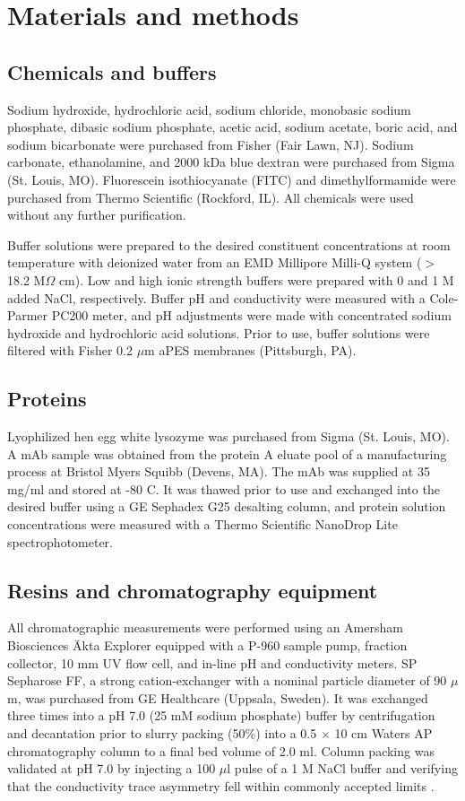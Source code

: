 \documentclass[preprint,review,12pt]{elsarticle}
\begin{document}
\section{Materials and methods} \label{sec:mm}

    \subsection{Chemicals and buffers} \label{ssec:buffers}
        Sodium hydroxide, hydrochloric acid, sodium chloride, monobasic sodium phosphate, dibasic sodium phosphate, acetic acid, sodium acetate, boric acid, and sodium bicarbonate were purchased from Fisher (Fair Lawn, NJ). Sodium carbonate, ethanolamine, and 2000 kDa blue dextran were purchased from Sigma (St. Louis, MO). Fluorescein isothiocyanate (FITC) and dimethylformamide were purchased from Thermo Scientific (Rockford, IL). All chemicals were used without any further purification.

        Buffer solutions were prepared to the desired constituent concentrations at room temperature with deionized water from an EMD Millipore Milli-Q system ($>$ 18.2 M$\Omega$ cm). Low and high ionic strength buffers were prepared with 0 and 1 M added NaCl, respectively. Buffer pH and conductivity were measured with a Cole-Parmer PC200 meter, and pH adjustments were made with concentrated sodium hydroxide and hydrochloric acid solutions. Prior to use, buffer solutions were filtered with Fisher 0.2 $\mu$m aPES membranes (Pittsburgh, PA).

    \subsection{Proteins} \label{ssec:proteins}
        Lyophilized hen egg white lysozyme was purchased from Sigma (St. Louis, MO). A mAb sample was obtained from the protein A eluate pool of a manufacturing process at Bristol Myers Squibb (Devens, MA). The mAb was supplied at 35 mg/ml and stored at -80 \degree C. It was thawed prior to use and exchanged into the desired buffer using a GE Sephadex G25 desalting column, and protein solution concentrations were measured with a Thermo Scientific NanoDrop Lite spectrophotometer.

    \subsection{Resins and chromatography equipment} \label{ssec:equip}
        All chromatographic measurements were performed using an Amersham Biosciences \"{A}kta Explorer equipped with a P-960 sample pump, fraction collector, 10 mm UV flow cell, and in-line pH and conductivity meters. SP Sepharose FF, a strong cation-exchanger with a nominal particle diameter of 90 $\mu$m, was purchased from GE Healthcare (Uppsala, Sweden). It was exchanged three times into a pH 7.0 (25 mM sodium phosphate) buffer by centrifugation and decantation prior to slurry packing (50\%) into a 0.5 $\times$ 10 cm Waters AP chromatography column to a final bed volume of 2.0 ml. Column packing was validated at pH 7.0 by injecting a 100 $\mu$l pulse of a 1 M NaCl buffer and verifying that the conductivity trace asymmetry fell within commonly accepted limits \cite{Carta2010a}.
\end{document}
